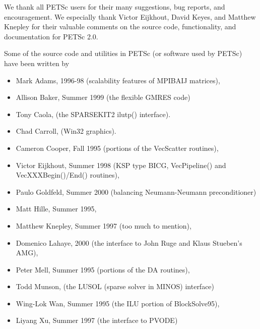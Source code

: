 %
%

\medskip \medskip \noindent
We thank all PETSc users for their many suggestions, bug reports, and
encouragement.  We especially thank Victor Eijkhout, David Keyes, and
Matthew Knepley for their valuable comments on the source code,
functionality, and documentation for PETSc 2.0.


\vspace{.3in}
\noindent
Some of the source code and utilities in PETSc (or software used by PETSc)
have been written by 
\begin{itemize}
  \item Mark Adams, 1996-98 (scalability features of MPIBAIJ matrices),
  \item Allison Baker, Summer 1999 (the flexible GMRES code)
  \item Tony Caola, (the SPARSEKIT2 ilutp() interface).
  \item Chad Carroll, (Win32 graphics).
  \item Cameron Cooper, Fall 1995 (portions of the VecScatter routines), 
  \item Victor Eijkhout, Summer 1998 (KSP type BICG, VecPipeline() and VecXXXBegin()/End() routines), 
  \item Paulo Goldfeld, Summer 2000 (balancing Neumann-Neumann preconditioner)
  \item Matt Hille, Summer 1995,
  \item Matthew Knepley, Summer 1997 (too much to mention),
  \item Domenico Lahaye, 2000 (the interface to John Ruge and Klaus Stueben's AMG),
  \item Peter Mell, Summer 1995 (portions of the DA routines),
  \item Todd Munson, (the LUSOL (sparse solver in MINOS) interface)
  \item Wing-Lok Wan, Summer 1995 (the ILU portion of BlockSolve95),
  \item Liyang Xu, Summer 1997 (the interface to PVODE)
\end{itemize}

